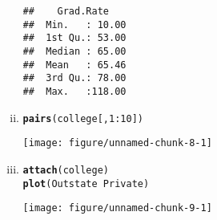 \documentclass{article}\usepackage[]{graphicx}\usepackage[]{color}
\makeatletter
\def\maxwidth{ %
  \ifdim\Gin@nat@width>\linewidth
    \linewidth
  \else
    \Gin@nat@width
  \fi
}
\newcommand{\hlnum}[1]{\textcolor[rgb]{0.686,0.059,0.569}{#1}}%
\newcommand{\hlopt}[1]{\textcolor[rgb]{0,0,0}{#1}}%
\newcommand{\hlstd}[1]{\textcolor[rgb]{0.345,0.345,0.345}{#1}}%
\newcommand{\hlkwd}[1]{\textcolor[rgb]{0.737,0.353,0.396}{\textbf{#1}}}%
\newenvironment{kframe}{%
 \def\at@end@of@kframe{}%
 \ifinner\ifhmode%
  \def\at@end@of@kframe{\end{minipage}}%
  \begin{minipage}{\columnwidth}%
 \fi\fi%
 \def\FrameCommand##1{\hskip\@totalleftmargin \hskip-\fboxsep
 \colorbox{shadecolor}{##1}\hskip-\fboxsep
     \hskip-\linewidth \hskip-\@totalleftmargin \hskip\columnwidth}%
 \MakeFramed {\advance\hsize-\width
   \@totalleftmargin\z@ \linewidth\hsize
   \@setminipage}}%
 {\par\unskip\endMakeFramed%
 \at@end@of@kframe}
\newenvironment{knitrout}{}{} %
\makeatother
\begin{document}
\begin{enumerate}[(a)]
\begin{enumerate}[(i)]
\begin{knitrout}
\begin{kframe}
\begin{verbatim}
##    Grad.Rate     
##  Min.   : 10.00  
##  1st Qu.: 53.00  
##  Median : 65.00  
##  Mean   : 65.46  
##  3rd Qu.: 78.00  
##  Max.   :118.00
\end{verbatim}
\end{kframe}
\end{knitrout}
\item
\begin{knitrout}
\color{fgcolor}\begin{kframe}
\begin{alltt}
\hlkwd{pairs}\hlstd{(college[,}\hlnum{1}\hlopt{:}\hlnum{10}\hlstd{])}
\end{alltt}
\end{kframe}
\texttt{[image: figure/unnamed-chunk-8-1]} 

\end{knitrout}
\item
\begin{knitrout}
\color{fgcolor}\begin{kframe}
\begin{alltt}
\hlkwd{attach}\hlstd{(college)}
\hlkwd{plot}\hlstd{(Outstate}\hlopt{~}\hlstd{Private)}
\end{alltt}
\end{kframe}
\texttt{[image: figure/unnamed-chunk-9-1]} 


\end{knitrout}
\end{enumerate}
\end{enumerate}
\end{document}
